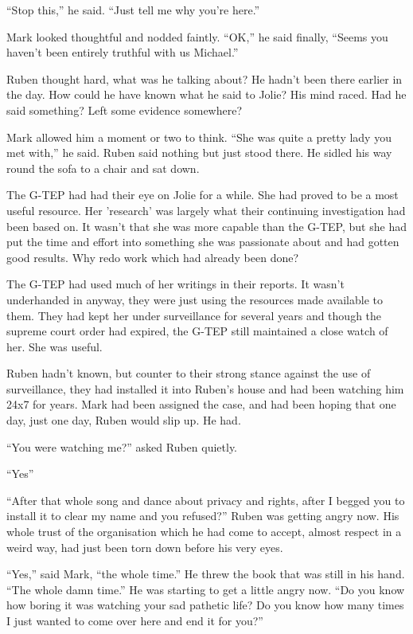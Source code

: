``Stop this,'' he said.  ``Just tell me why you're here.''

Mark looked thoughtful and nodded faintly.  ``OK,'' he said finally, ``Seems you haven't been entirely truthful with us Michael.''

Ruben thought hard, what was he talking about?  He hadn't been there earlier in the day.  How could he have known what he said to Jolie?  His mind raced.  Had he said something?  Left some evidence somewhere?  

Mark allowed him a moment or two to think.  ``She was quite a pretty lady you met with,'' he said.  Ruben said nothing but just stood there.  He sidled his way round the sofa to a chair and sat down.    

The G-TEP had had their eye on Jolie for a while.  She had proved to be a most useful resource.  Her 'research' was largely what their continuing investigation had been based on.  It wasn't that she was more capable than the G-TEP, but she had put the time and effort into something she was passionate about and had gotten good results.  Why redo work which had already been done?  

The G-TEP had used much of her writings in their reports.  It wasn't underhanded in anyway, they were just using the resources made available to them.  They had kept her under surveillance for several years and though the supreme court order had expired, the G-TEP still maintained a close watch of her.  She was useful.  

Ruben hadn't known, but counter to their strong stance against the use of surveillance, they had installed it into Ruben's house and had been watching him 24x7 for years.  Mark had been assigned the case, and had been hoping that one day, just one day, Ruben would slip up.  He had.

``You were watching me?'' asked Ruben quietly.

``Yes''

``After that whole song and dance about privacy and rights, after I begged you to install it to clear my name and you refused?''  Ruben was getting angry now.  His whole trust of the organisation which he had come to accept, almost respect in a weird way, had just been torn down before his very eyes.

``Yes,'' said Mark, ``the whole time.''  He threw the book that was still in his hand.  ``The whole damn time.''  He was starting to get a little angry now.  ``Do you know how boring it was watching your sad pathetic life?  Do you know how many times I just wanted to come over here and end it for you?''  

